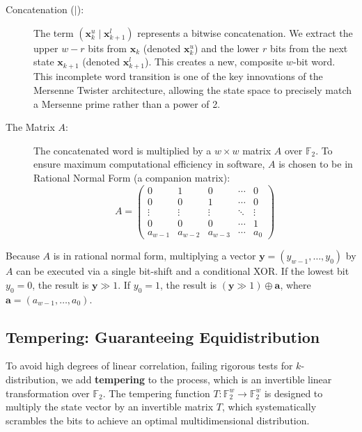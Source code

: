 \begin{description}
    \item[Concatenation ($\mid$):] The term $\left( \mathbf{x}_k^u \mid \mathbf{x}_{k+1}^l \right)$ represents a bitwise concatenation. We extract the upper $w-r$ bits from $\mathbf{x}_k$ (denoted $\mathbf{x}_k^u$) and the lower $r$ bits from the next state $\mathbf{x}_{k+1}$ (denoted $\mathbf{x}_{k+1}^l$). This creates a new, composite $w$-bit word. This incomplete word transition is one of the key innovations of the Mersenne Twister architecture, allowing the state space to precisely match a Mersenne prime rather than a power of 2.
    \item[The Matrix $A$:] The concatenated word is multiplied by a $w \times w$ matrix $A$ over $\mathbb{F}_2$. To ensure maximum computational efficiency in software, $A$ is chosen to be in Rational Normal Form (a companion matrix):
    \[
    A = \begin{pmatrix}
    0 & 1 & 0 & \cdots & 0 \\
    0 & 0 & 1 & \cdots & 0 \\
    \vdots & \vdots & \vdots & \ddots & \vdots \\
    0 & 0 & 0 & \cdots & 1 \\
    a_{w-1} & a_{w-2} & a_{w-3} & \cdots & a_0
    \end{pmatrix}
    \]
\end{description}

\begin{remark}
Because $A$ is in rational normal form, multiplying a vector $\mathbf{y} = (y_{w-1}, \dots, y_0)$ by $A$ can be executed via a single bit-shift and a conditional XOR. If the lowest bit $y_0 = 0$, the result is $\mathbf{y} \gg 1$. If $y_0 = 1$, the result is $(\mathbf{y} \gg 1) \oplus \mathbf{a}$, where $\mathbf{a} = (a_{w-1}, \dots, a_0)$. 
\end{remark}

\subsection{Tempering: Guaranteeing Equidistribution}

To avoid high degrees of linear correlation, failing rigorous tests for $k$-distribution, we add \textbf{tempering} to the process, which is an invertible linear transformation over $\mathbb{F}_2$. The tempering function $T: \mathbb{F}_2^w \to \mathbb{F}_2^w$ is designed to multiply the state vector by an invertible matrix $T$, which systematically scrambles the bits to achieve an optimal multidimensional distribution.

